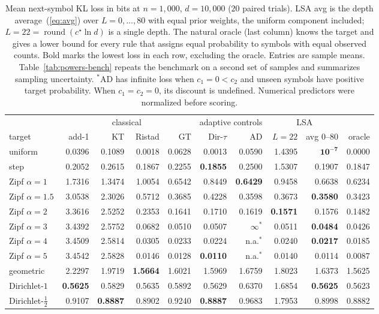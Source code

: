 \documentclass[anon]{alt2027}
\newcommand{\cstar}{c^{\star}}
\renewcommand{\eqref}[1]{(\ref{#1})}
\begin{document}
\begin{table}[t]
\centering
\caption{Mean next-symbol KL loss in bits at $n=1{,}000$, $d=10{,}000$ ($20$ paired trials). LSA avg is the depth average~\eqref{eq:avg} over $L=0,\dots,80$ with equal prior weights, the uniform component included; $L=22=\operatorname{round}(\cstar\ln d)$ is a single depth. The natural oracle (last column) knows the target and gives a lower bound for every rule that assigns equal probability to symbols with equal observed counts. Bold marks the lowest loss in each row, excluding the oracle. Entries are sample means. Table~\ref{tab:powers-bench} repeats the benchmark on a second set of samples and summarizes sampling uncertainty. $^{*}$AD has infinite loss when $c_1=0<c_2$ and unseen symbols have positive target probability. When $c_1=c_2=0$, its discount is undefined. Numerical predictors were normalized before scoring.}

\label{tab:bench}
\footnotesize\setlength{\tabcolsep}{3.2pt}
\begin{tabular}{lrrrr|rr|rr|r}
\toprule
& \multicolumn{4}{c|}{classical} & \multicolumn{2}{c|}{adaptive controls} & \multicolumn{2}{c|}{LSA} & \\
target & add-1 & KT & Ristad & GT & Dir-$\tau$ & AD & $L=22$ & avg $0$--$80$ & oracle\\
\midrule
uniform & 0.0396 & 0.1089 & 0.0018 & 0.0628 & 0.0013 & 0.0590 & 1.4395 & $\mathbf{10^{-7}}$ & 0.0000\\
step & 0.2052 & 0.2615 & 0.1867 & 0.2255 & \textbf{0.1855} & 0.2500 & 1.5307 & 0.1907 & 0.1847\\
Zipf $\alpha=1$ & 1.7316 & 1.3474 & 1.0054 & 0.6542 & 0.8449 & \textbf{0.6429} & 0.9458 & 0.6638 & 0.6234\\
Zipf $\alpha=1.5$ & 3.0538 & 2.3026 & 0.5712 & 0.3685 & 0.4228 & 0.3598 & 0.3673 & \textbf{0.3580} & 0.3423\\
Zipf $\alpha=2$ & 3.3616 & 2.5252 & 0.2353 & 0.1641 & 0.1710 & 0.1619 & \textbf{0.1571} & 0.1576 & 0.1482\\
Zipf $\alpha=3$ & 3.4392 & 2.5752 & 0.0682 & 0.0510 & 0.0507 & $\infty^{*}$ & 0.0511 & \textbf{0.0484} & 0.0426\\
Zipf $\alpha=4$ & 3.4509 & 2.5814 & 0.0305 & 0.0233 & 0.0224 & n.a.$^{*}$ & 0.0240 & \textbf{0.0217} & 0.0185\\
Zipf $\alpha=5$ & 3.4542 & 2.5828 & 0.0146 & 0.0128 & \textbf{0.0110} & n.a.$^{*}$ & 0.0140 & 0.0114 & 0.0087\\
geometric & 2.2297 & 1.9719 & \textbf{1.5664} & 1.6021 & 1.5969 & 1.6759 & 1.8023 & 1.6373 & 1.5625\\
Dirichlet-$1$ & \textbf{0.5625} & 0.5829 & 0.5635 & 0.5892 & 0.5629 & 0.6370 & 1.6854 & \textbf{0.5625} & 0.5623\\
Dirichlet-$\frac12$ & 0.9107 & \textbf{0.8887} & 0.8902 & 0.9240 & \textbf{0.8887} & 0.9683 & 1.7953 & 0.8998 & 0.8882\\
\bottomrule
\end{tabular}
\end{table}
\end{document}

